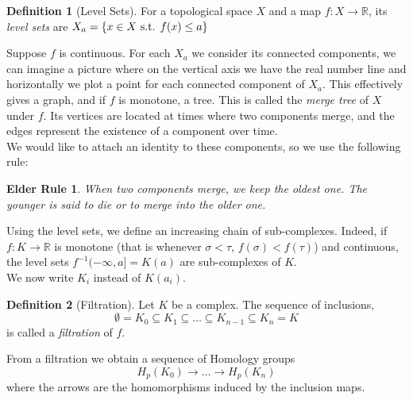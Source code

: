 \documentclass{article}
\newcommand{\R}{\mathbb{R}}
\newcommand{\inv}{^{-1}}
\newcommand{\st}{\textmd{ s.t. }}
\theoremstyle{plain}
\newtheorem*{ER}{Elder Rule}
\theoremstyle{definition}
\newtheorem{definition}{Definition}[section]
\theoremstyle{remark}
\begin{document}
\begin{definition}[Level Sets]
For a topological space $X$ and a map $f:X\to \R$, its \emph{level sets} are $ X_a=\{ x \in X \st f(x) \leq a\} $
\end{definition}

Suppose $f$ is continuous. For each $X_a$ we consider its connected components, we can imagine a picture where on the vertical axis we have the real number line and horizontally we plot a point for each connected component of $X_a$. This effectively gives a graph, and if $f$ is monotone, a tree. This is called the \emph{merge tree} of $X$ under $f$. Its vertices are located at times where two components merge, and the edges represent the existence of a component over time. \\
We would like to attach an identity to these components, so we use the following rule:
\begin{ER}
When two components merge, we keep the oldest one. The younger is said to die or to merge into the older one.
\end{ER}

Using the level sets, we define an increasing chain of sub-complexes. Indeed, if $f:K \to \R$ is monotone (that is whenever $\sigma < \tau$, $f(\sigma) < f(\tau)$) and continuous, the level sets $f\inv(-\infty, a] = K(a)$ are sub-complexes of $K$. \\
We now write $K_i$ instead of $K(a_i)$.
\begin{definition}[Filtration]
Let $K$ be a complex. The sequence of inclusions,
\[ \emptyset = K_0 \subseteq K_1 \subseteq \dots \subseteq K_{n-1} \subseteq K_n = K \] is called a \emph{filtration} of $f$.
\end{definition}

From a filtration we obtain a sequence of Homology groups 
\[ H_p(K_0) \rightarrow \dots \rightarrow H_p(K_n) \] where the arrows are the homomorphisms induced by the inclusion maps.
\end{document}
